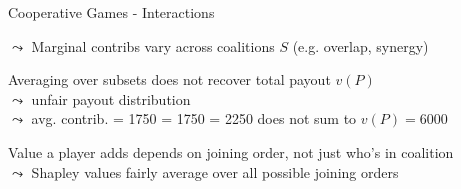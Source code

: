 \documentclass[10pt,compress,t,notes=noshow, xcolor=table]{beamer}
\begin{document}
\begin{framev}[align=top]{Cooperative Games - Interactions}
\begin{itemizeM}
$\leadsto$ Marginal contribs vary across coalitions $S$ (e.g. overlap, synergy)
\item Averaging over subsets does not recover total payout $v(P)$\\
$\leadsto$ unfair payout distribution\\
$\leadsto$ avg. contrib.  = 1750  = 1750  = 2250 does not sum to $v(P) = 6000$
\item Value a player adds depends on joining order, not just who's in coalition\\
$\leadsto$ Shapley values fairly average over all possible joining orders
\end{itemizeM}
\end{framev}
\end{document}
